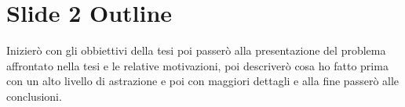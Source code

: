 \section{Slide 2 Outline}
Inizier\`o con gli obbiettivi della tesi poi passer\`o alla presentazione del problema affrontato nella tesi e le relative motivazioni, poi descriver\`o cosa ho fatto prima con un alto livello di astrazione e poi con maggiori dettagli e alla fine passer\`o alle conclusioni.